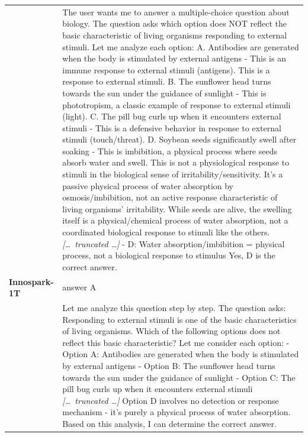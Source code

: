 \begin{longtable}{@{}l p{12.5cm}@{}}
  & The user wants me to answer a multiple-choice question about biology. The question asks which option does NOT reflect the basic characteristic of living organisms responding to external stimuli. \newline Let me analyze each option: \newline A. Antibodies are generated when the body is stimulated by external antigens - This is an immune response to external stimuli (antigens). This is a response to external stimuli. \newline B. The sunflower head turns towards the sun under the guidance of sunlight - This is phototropism, a classic example of response to external stimuli (light). \newline C. The pill bug curls up when it encounters external stimuli - This is a defensive behavior in response to external stimuli (touch/threat). \newline D. Soybean seeds significantly swell after soaking - This is imbibition, a physical process where seeds absorb water and swell. This is not a physiological response to stimuli in the biological sense of irritability/sensitivity. It's a passive physical process of water absorption by osmosis/imbibition, not an active response characteristic of living organisms' irritability. While seeds are alive, the swelling itself is a physical/chemical process of water absorption, not a coordinated biological response to stimuli like the others. \newline \textit{[\ldots\ truncated \ldots]} \newline - D: Water absorption/imbibition = physical process, not a biological response to stimulus \newline Yes, D is the correct answer. \\
  \textbf{Innospark-1T} & answer A \\
  & Let me analyze this question step by step. \newline The question asks: Responding to external stimuli is one of the basic characteristics of living organisms. Which of the following options does not reflect this basic characteristic? \newline Let me consider each option: \newline - Option A: Antibodies are generated when the body is stimulated by external antigens \newline - Option B: The sunflower head turns towards the sun under the guidance of sunlight \newline - Option C: The pill bug curls up when it encounters external stimuli \newline \textit{[\ldots\ truncated \ldots]} \newline Option D involves no detection or response mechanism - it's purely a physical process of water absorption. \newline Based on this analysis, I can determine the correct answer. \\

\end{longtable}
